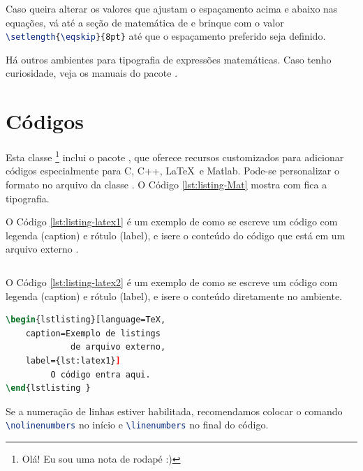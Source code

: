 \documentclass[12pt,a4paper,oneside,linenumbers=off,latinmodern=off,timesnews=off,spanish,english,portuges]{rctart-class/rctart}
\begin{document}
        Caso queira alterar os valores que ajustam o espaçamento acima e abaixo nas equações, vá até a seção de matemática de  e brinque com o valor  \lstinline[language=TeX]|\setlength{\eqskip}{8pt}|  até que o espaçamento preferido seja definido.
        
        Há outros ambientes para tipografia de expressões matemáticas. Caso tenho curiosidade, veja os manuais do pacote .

\section{Códigos}

    Esta classe \footnote{Olá! Eu sou uma nota de rodapé :)} inclui o pacote , que oferece recursos customizados para adicionar códigos especialmente para C, C++, \LaTeX\ e Matlab. Pode-se personalizar o formato no arquivo da classe . O Código \ref{lst:listing-Mat} mostra com fica a tipografia.

    \nolinenumbers
    
    \linenumbers
    
    O Código \ref{lst:listing-latex1} é um exemplo de como se escreve um código com legenda (caption) e rótulo (label), e isere o conteúdo do código que está em um arquivo externo .
    \nolinenumbers
\begin{lstlisting}[language=TeX,caption=Exemplo de listings com código em arquivo externo,label={lst:listing-latex1}]

\end{lstlisting}
    
     O Código \ref{lst:listing-latex2} é um exemplo de como se escreve um código com legenda (caption) e rótulo (label), e isere o conteúdo diretamente no ambiente.
    \nolinenumbers
\begin{lstlisting}[language=TeX,caption=Exemplo de listings com código em arquivo externo,label={lst:listing-latex2}]
\begin{lstlisting}[language=TeX,
    caption=Exemplo de listings 
             de arquivo externo,
    label={lst:latex1}]
         O código entra aqui.
\end{lstlisting }
\end{lstlisting}
    
    
    Se a numeração de linhas estiver habilitada, recomendamos colocar o comando \lstinline[language=TeX]|\nolinenumbers| no início e \lstinline[language=TeX]|\linenumbers| no final do código. 
    
\end{document}
